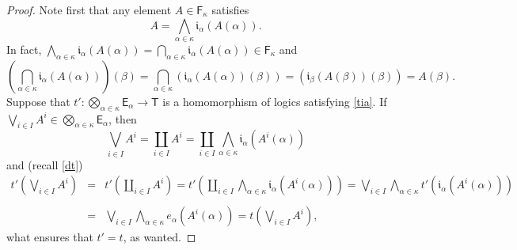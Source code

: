 \documentclass[10pt,a4paper]{amsart}
\begin{document}
\begin{proof}
Note first that any element $A\in\mathsf{F}_{\kappa}$ satisfies
\begin{equation}
A={\textstyle \bigwedge_{\alpha\in\kappa}}\mathfrak{i}_{\alpha}\left(A\left(\alpha\right)\right).\label{aA}
\end{equation}
In fact, ${\textstyle \bigwedge_{\alpha\in\kappa}}\mathfrak{i}_{\alpha}\left(A\left(\alpha\right)\right)={\textstyle \bigcap_{\alpha\in\kappa}}\mathfrak{i}_{\alpha}\left(A\left(\alpha\right)\right)\in\mathsf{F}_{\kappa}$
and
\[
\left({\textstyle \bigcap_{\alpha\in\kappa}}\mathfrak{i}_{\alpha}\left(A\left(\alpha\right)\right)\right)\left(\beta\right)={\textstyle \bigcap_{\alpha\in\kappa}}\left(\mathfrak{i}_{\alpha}\left(A\left(\alpha\right)\right)\left(\beta\right)\right)=\left(\mathfrak{i}_{\beta}\left(A\left(\beta\right)\right)\left(\beta\right)\right)=A\left(\beta\right).
\]
Suppose that $t':{\textstyle \bigotimes_{\alpha\in\kappa}}\mathsf{E}_{\alpha}\rightarrow\mathsf{T}$
is a homomorphism of logics satisfying \eqref{tia}. If ${\textstyle \bigvee_{i\in I}}A^{i}\in{\textstyle \bigotimes_{\alpha\in\kappa}}\mathsf{E}_{\alpha}$,
then
\[
{\textstyle \bigvee_{i\in I}}A^{i}={\textstyle \coprod_{i\in I}}A^{i}={\textstyle \coprod_{i\in I}}{\textstyle \bigwedge_{\alpha\in\kappa}}\mathfrak{i}_{\alpha}\left(A^{i}\left(\alpha\right)\right)
\]
and (recall \eqref{dt})
\[
\begin{array}{lll}
t'\left({\textstyle \bigvee_{i\in I}}A^{i}\right) & = & t'\left({\textstyle \coprod_{i\in I}}A^{i}\right)=t'\left({\textstyle \coprod_{i\in I}}{\textstyle \bigwedge_{\alpha\in\kappa}}\mathfrak{i}_{\alpha}\left(A^{i}\left(\alpha\right)\right)\right)={\textstyle \bigvee_{i\in I}}{\textstyle \bigwedge_{\alpha\in\kappa}}t'\left(\mathfrak{i}_{\alpha}\left(A^{i}\left(\alpha\right)\right)\right)\\
\\
 & = & {\textstyle \bigvee_{i\in I}}{\textstyle \bigwedge_{\alpha\in\kappa}}e_{\alpha}\left(A^{i}\left(\alpha\right)\right)=t\left({\textstyle \bigvee_{i\in I}}A^{i}\right),
\end{array}
\]
what ensures that $t'=t$, as wanted. 
\end{proof}
\end{document}
